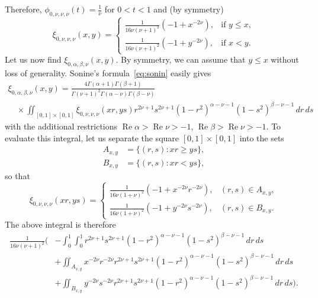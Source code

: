 \documentclass[10pt,leqno,a4paper]{article}
\theoremstyle{plain}
\renewcommand{\Re}{\operatorname{Re}}
\numberwithin{equation}{section}
\begin{document}
Therefore, $\phi_{0,\nu,\nu,\nu}(t) = \frac{1}{\nu}$ for $0 < t < 1$ and (by symmetry)
\begin{equation}
\label{cop}
   \xi_{0,\nu,\nu,\nu}(x,y)
   = \begin{cases}
   \frac{1}{16\nu (\nu+1)^2}
   \left( -1 + x^{-2\nu} \right), & \text{if } y \leq x,
   \\
   \frac{1}{16\nu (\nu+1)^2}
   \left( -1 + y^{-2\nu} \right),& \text{if } x < y.
   \end{cases}
\end{equation}
Let us now find $\xi_{0,\alpha,\beta,\nu}(x,y)$. By symmetry, we can assume that $y\leq x$ without loss of generality. Sonine's formula~\eqref{eq:sonin} easily gives
\begin{multline*}
   \xi_{0,\alpha,\beta,\nu}(x,y)
   = \frac{4\Gamma(\alpha+1) \Gamma(\beta+1)}
   {\Gamma(\nu+1)^2\Gamma(\alpha-\nu)\Gamma(\beta-\nu)}
   \\
   \quad \times \iint_{[0,1]\times[0,1]}
   \xi_{0,\nu,\nu,\nu}(xr, ys) r^{2\nu+1} s^{2\nu+1}
   (1-r^2)^{\alpha-\nu-1} (1-s^2)^{\beta-\nu-1} \, dr \, ds
\end{multline*}
with the additional restrictions $\Re \alpha > \Re \nu > -1$, $\Re \beta > \Re \nu > -1$.
To evaluate this integral, let us separate the square $[0,1]\times [0,1]$ into the sets
\begin{align*}
   A_{x,y} &= \{(r,s) : x r \geq y s \},
   \\
   B_{x,y} &= \{(r,s) : x r < y s \},
\end{align*}
so that
\[
   \xi_{0,\nu,\nu,\nu}(xr,ys)
   = \begin{cases}
   \frac{1}{16\nu(1+\nu)^2} \left(-1+x^{-2\nu} r^{-2\nu} \right),
   & (r,s) \in A_{x,y},
   \\
   \frac{1}{16\nu(1+\nu)^2} \left(-1+y^{-2\nu}s^{-2\nu}\right),
   & (r,s) \in B_{x,y}.
   \end{cases}
\]
The above integral is therefore
\begin{align*}
   \frac{1}{16\nu(\nu+1)^2}
   \Bigg(
   &{-}\int_0^1 \int_0^1 r^{2\nu+1} s^{2\nu+1}
   (1-r^2)^{\alpha-\nu-1} (1-s^2)^{\beta-\nu-1} \,dr \, ds
   \\
   &+ \iint_{A_{x,y}} x^{-2\nu} r^{-2\nu} r^{2\nu+1} s^{2\nu+1} (1-r^2)^{\alpha-\nu-1}
   (1-s^2)^{\beta-\nu-1} \, dr \, ds
   \\
   &+ \iint_{B_{x,y}} y^{-2\nu} s^{-2\nu} r^{2\nu+1} s^{2\nu+1} (1-r^2)^{\alpha-\nu-1}
   (1-s^2)^{\beta-\nu-1} \, dr \, ds
   \Bigg).
\end{align*}
\end{document}
